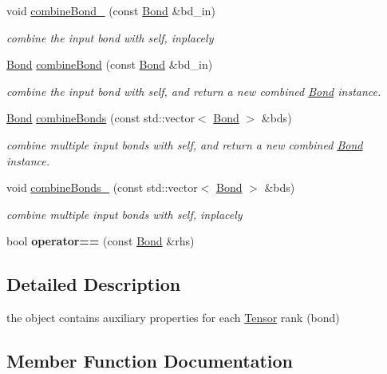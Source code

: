 \begin{DoxyCompactItemize}
void \hyperlink{classcytnx_1_1Bond_ac21ab26ec469ac56ae78c9e4bbbe7040}{combine\+Bond\+\_\+} (const \hyperlink{classcytnx_1_1Bond}{Bond} \&bd\+\_\+in)
\begin{DoxyCompactList}\small\item\em combine the input bond with self, inplacely \end{DoxyCompactList}\item 
\hyperlink{classcytnx_1_1Bond}{Bond} \hyperlink{classcytnx_1_1Bond_a609c034885efa32fc244be82a56e1f8c}{combine\+Bond} (const \hyperlink{classcytnx_1_1Bond}{Bond} \&bd\+\_\+in)
\begin{DoxyCompactList}\small\item\em combine the input bond with self, and return a new combined \hyperlink{classcytnx_1_1Bond}{Bond} instance. \end{DoxyCompactList}\item 
\hyperlink{classcytnx_1_1Bond}{Bond} \hyperlink{classcytnx_1_1Bond_a4a1d060cf2d0c44d83356df757a802d1}{combine\+Bonds} (const std\+::vector$<$ \hyperlink{classcytnx_1_1Bond}{Bond} $>$ \&bds)
\begin{DoxyCompactList}\small\item\em combine multiple input bonds with self, and return a new combined \hyperlink{classcytnx_1_1Bond}{Bond} instance. \end{DoxyCompactList}\item 
void \hyperlink{classcytnx_1_1Bond_a1fd655bfe0845839502b6e385d743078}{combine\+Bonds\+\_\+} (const std\+::vector$<$ \hyperlink{classcytnx_1_1Bond}{Bond} $>$ \&bds)
\begin{DoxyCompactList}\small\item\em combine multiple input bonds with self, inplacely \end{DoxyCompactList}\item 
\mbox{\label{classcytnx_1_1Bond_a3505ee4175e05332e4965fd719aed840}} 
bool {\bfseries operator==} (const \hyperlink{classcytnx_1_1Bond}{Bond} \&rhs)
\end{DoxyCompactItemize}


\subsection{Detailed Description}
the object contains auxiliary properties for each \hyperlink{classcytnx_1_1Tensor}{Tensor} rank (bond) 

\subsection{Member Function Documentation}
\mbox{\label{classcytnx_1_1Bond_a8c4d6443ffe7c3f3ecd8c474fd9a18eb}} 
